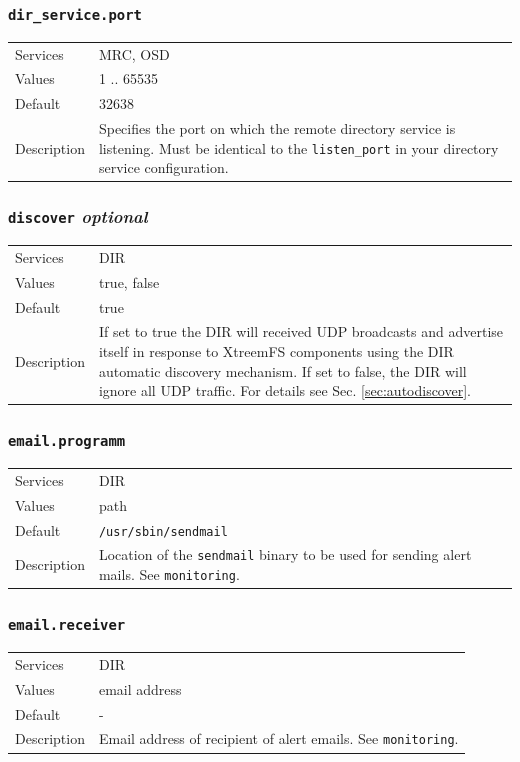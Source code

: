\documentclass[a4paper,10pt]{book}
\begin{document}
\subsubsection{\texttt{dir\_service.port}}
\begin{tabular}{lp{10cm}}
 Services & MRC, OSD\\
 Values   & 1 .. 65535 \\
 Default  & 32638 \\
 Description & Specifies the port on which the remote directory service is listening. Must be identical to the \texttt{listen\_port} in your directory service configuration.
\end{tabular}

\subsubsection{\texttt{discover} \textit{optional}}
\begin{tabular}{lp{10cm}}
 Services & DIR\\
 Values   & true, false \\
 Default  & true \\
 Description & If set to true the DIR will received UDP broadcasts and advertise itself in response to XtreemFS components using the DIR automatic discovery mechanism. If set to false, the DIR will ignore all UDP traffic. For details see Sec. \ref{sec:autodiscover}.
\end{tabular}

\subsubsection{\texttt{email.programm}}
\begin{tabular}{lp{10cm}}
 Services & DIR\\
 Values   & path \\
 Default  & \texttt{/usr/sbin/sendmail} \\
 Description & Location of the \texttt{sendmail} binary to be used for sending alert mails. See \texttt{monitoring}.
\end{tabular}

\subsubsection{\texttt{email.receiver}}
\begin{tabular}{lp{10cm}}
 Services & DIR\\
 Values   & email address \\
 Default  & - \\
 Description & Email address of recipient of alert emails. See \texttt{monitoring}.
\end{tabular}
\end{document}
